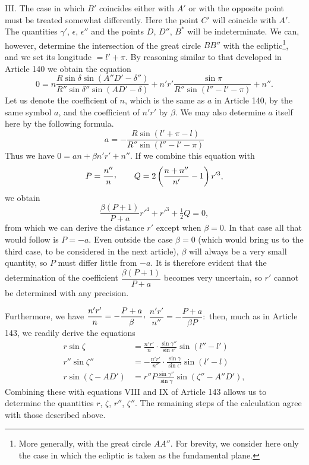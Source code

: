 III. The case in which $B'$ coincides either with $A'$ or with the opposite point must be treated somewhat differently. Here the point $C'$ will coincide with $A'$. The quantities $\gamma'$, $\epsilon$, $\epsilon''$ and the points $D$, $D''$, $B^*$ will be indeterminate. We can, however, determine the intersection of the great circle $BB''$ with the ecliptic\footnote{More generally, with the great circle $AA''$. For brevity, we consider here only the case in which the ecliptic is taken as the fundamental plane.}, and we set its longitude $=l'+\pi$. By reasoning similar to that developed in Article 140 we obtain the equation
\[
0=n\frac{R\sin\delta\sin(A''D'-\delta'')}{R''\sin\delta''\sin(AD'-\delta)}
+n'r'\frac{\sin\pi}{R''\sin(l''-l'-\pi)}+n''.
\]
Let us denote the coefficient of $n$, which is the same as $a$ in Article 140, by the same symbol $a$, and the coefficient of $n'r'$ by $\beta$. We may also determine $a$ itself here by the following formula.
\[
a=-\frac{R\sin(l'+\pi-l)}{R''\sin(l''-l'-\pi)}
\]
Thus we have $0=an+\beta n'r'+n''$. If we combine this equation with
\[
P=\frac{n''}{n}\mathpunct{\raisebox{.45ex}{,}}\qquad
Q=2\left(\frac{n+n''}{n'}-1\right)r'^3,
\]
we obtain
\[
\frac{\beta(P+1)}{P+a}r'^4+r'^3+\tfrac12Q=0,
\]
from which we can derive the distance $r'$ except when $\beta=0$. In that case all that would follow is $P=-a$. Even outside the case $\beta=0$ (which would bring us to the third case, to be considered in the next article), $\beta$ will always be a very small quantity, so $P$ must differ little from $-a$. It is therefore evident that the determination of the coefficient $\dfrac{\beta(P+1)}{P+a}$ becomes very uncertain, so $r'$ cannot be determined with any precision.

Furthermore, we have $\dfrac{n'r'}{n}=-\dfrac{P+a}{\beta}\mathpunct{\raisebox{.45ex}{,}}$
$\dfrac{n'r'}{n''}=-\dfrac{P+a}{\beta P}\mathpunct{:}$ then, much as in Article 143, we readily derive the equations
\[
\begin{aligned}
r\sin\zeta&=\frac{n'r'}{n}\cdot\frac{\sin\gamma''}{\sin\epsilon'}\sin(l''-l')\\[.5em]
r''\sin\zeta''&=-\frac{n'r'}{n''}\cdot\frac{\sin\gamma}{\sin\epsilon'}\sin(l'-l)\\[.5em]
r\sin(\zeta-AD')&=r''P\frac{\sin\gamma''}{\sin\gamma}\sin(\zeta''-A''D'),
\end{aligned}
\]
Combining these with equations VIII and IX of Article 143 allows us to determine the quantities $r$, $\zeta$, $r''$, $\zeta''$. The remaining steps of the calculation agree with those described above.
